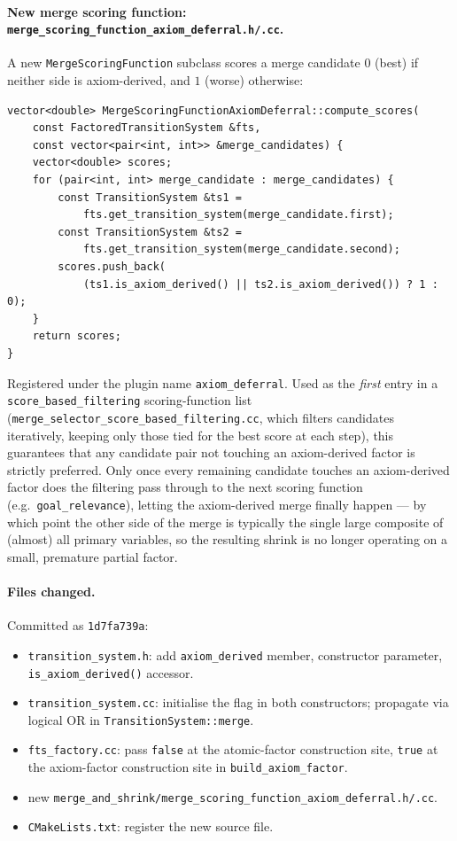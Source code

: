 \documentclass[11pt,a4paper]{article}
\begin{document}
\paragraph{New merge scoring function: \texttt{merge\_scoring\_function\_axiom\_deferral.h/.cc}.}
A new \texttt{MergeScoringFunction} subclass scores a merge candidate $0$
(best) if neither side is axiom-derived, and $1$ (worse) otherwise:
\begin{lstlisting}
vector<double> MergeScoringFunctionAxiomDeferral::compute_scores(
    const FactoredTransitionSystem &fts,
    const vector<pair<int, int>> &merge_candidates) {
    vector<double> scores;
    for (pair<int, int> merge_candidate : merge_candidates) {
        const TransitionSystem &ts1 =
            fts.get_transition_system(merge_candidate.first);
        const TransitionSystem &ts2 =
            fts.get_transition_system(merge_candidate.second);
        scores.push_back(
            (ts1.is_axiom_derived() || ts2.is_axiom_derived()) ? 1 : 0);
    }
    return scores;
}
\end{lstlisting}
Registered under the plugin name \texttt{axiom\_deferral}. Used as the
\emph{first} entry in a \texttt{score\_based\_filtering} scoring-function
list (\texttt{merge\_selector\_score\_based\_filtering.cc}, which filters
candidates iteratively, keeping only those tied for the best score at each
step), this guarantees that any candidate pair not touching an axiom-derived
factor is strictly preferred. Only once every remaining candidate touches an
axiom-derived factor does the filtering pass through to the next scoring
function (e.g.\ \texttt{goal\_relevance}), letting the axiom-derived merge
finally happen --- by which point the other side of the merge is typically
the single large composite of (almost) all primary variables, so the
resulting shrink is no longer operating on a small, premature partial
factor.

\paragraph{Files changed.} Committed as \texttt{1d7fa739a}:
\begin{itemize}
  \item \texttt{transition\_system.h}: add \texttt{axiom\_derived} member,
    constructor parameter, \texttt{is\_axiom\_derived()} accessor.
  \item \texttt{transition\_system.cc}: initialise the flag in both
    constructors; propagate via logical OR in \texttt{TransitionSystem::merge}.
  \item \texttt{fts\_factory.cc}: pass \texttt{false} at the atomic-factor
    construction site, \texttt{true} at the axiom-factor construction site
    in \texttt{build\_axiom\_factor}.
  \item new \texttt{merge\_and\_shrink/merge\_scoring\_function\_axiom\_deferral.h/.cc}.
  \item \texttt{CMakeLists.txt}: register the new source file.
\end{itemize}
\end{document}
